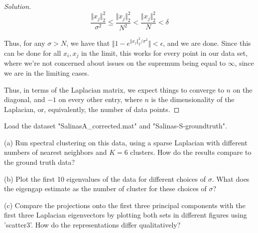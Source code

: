 \documentclass[10pt]{article}
\newenvironment{problem}[2][]{\begin{trivlist}
\item[\hskip \labelsep {\bfseries #1}\hskip \labelsep {\bfseries #2.}]}{\end{trivlist}}
\begin{document}
\begin{proof}[Solution]
$$ \frac{\Vert x_j \Vert_2^2}{\sigma^2}\leq  \frac{\Vert x_j \Vert_2^2}{N^2} <  \frac{\Vert x_j \Vert_2^2}{N} < \delta$$

Thus, for any $\sigma > N$, we have that $\Vert 1 - e^{\Vert x_j \Vert_2^2/\sigma^2} \Vert < \epsilon$, and we are done. Since this can be done for all $x_i, x_j$ in the limit, this works for every point in our data set, where we're not concerned about issues on the supremum being equal to $\infty$, since we are in the limiting cases.

Thus, in terms of the Laplacian matrix, we expect things to converge to $n$ on the diagonal, and $-1$ on every other entry, where $n$ is the dimensionality of the Laplacian, or, equivalently, the number of data points.



\end{proof}

\begin{problem}{Question 3}

Load the dataset "SalinasA\_corrected.mat" and "Salinas-S-groundtruth".

(a) Run spectral clustering on this data, using a sparse Laplacian with different numbers of nearest neighbors and $K = 6$ clusters. How do the results compare to the ground truth data?

(b) Plot the first 10 eigenvalues of the data for different choices of $\sigma$. What does the eigengap estimate as the number of cluster for these choices of $\sigma$?

(c) Compare the projections onto the first three principal components with the first three Laplacian eigenvectors by plotting both sets in different figures using 'scatter3'. How do the representations differ qualitatively?


\end{problem}
\end{document}
